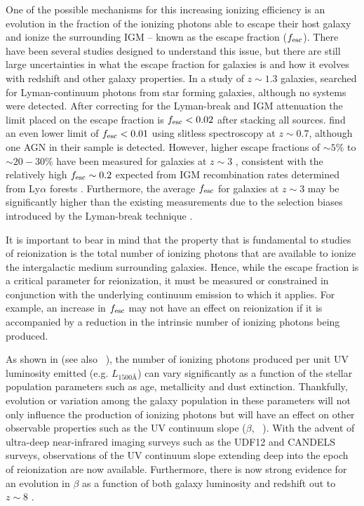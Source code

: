 One of the possible mechanisms for this increasing ionizing efficiency is an evolution in the fraction of the ionizing photons able to escape their host galaxy and ionize the surrounding IGM -- known as the escape fraction ($f_{\rm{esc}}$). There have been several studies designed to understand this issue, but there are still large uncertainties in what the escape fraction for galaxies is and how it evolves with redshift and other galaxy properties. In a study of $z \sim 1.3$ galaxies, \citet{Siana:2010bo} searched for Lyman-continuum photons from star forming galaxies, although no systems were detected.  After correcting for the Lyman-break and IGM attenuation the limit placed on the escape fraction is $f_{\rm esc} < 0.02$ after stacking all sources. \citet{Bridge:2010ie} find an even lower limit of $f_{\rm esc} < 0.01$ using slitless spectroscopy at $z \sim 0.7$, although one AGN in their sample is detected. However, higher escape fractions of $\sim5\%$ to $\sim20-30\%$ have been measured for galaxies at $z \sim 3$  \citep{Shapley:2006cq,Iwata:2009dy,Vanzella:2010jk,Nestor:2013kw}, consistent with the relatively high $f_{\rm esc} \sim 0.2$ expected from IGM recombination rates determined from Ly$\alpha$ forests \citep{Bolton:2007gc}. Furthermore, the average $f_{\rm{esc}}$ for galaxies at $z\sim3$ may be significantly higher than the existing measurements due to the selection biases introduced by the Lyman-break technique \citep{Cooke:2014dd}. 

It is important to bear in mind that the property that is fundamental to studies of reionization is the total number of ionizing photons that are available to ionize the intergalactic medium surrounding galaxies. Hence, while the escape fraction is a critical parameter for reionization, it must be measured or constrained in conjunction with the underlying continuum emission to which it applies. For example, an increase in $f_{\rm{esc}}$ may not have an effect on reionization if it is accompanied by a reduction in the intrinsic number of ionizing photons being produced.

As shown in \citet{Robertson:2013ji} (see also \citeauthor{Leitherer:1999jt}~\citeyear{Leitherer:1999jt}), the number of ionizing photons produced per unit UV luminosity emitted (e.g. $L_{1500\text{\AA}}$) can vary significantly as a function of the stellar population parameters such as age, metallicity and dust extinction. Thankfully, evolution or variation among the galaxy population in these parameters will not only influence the production of ionizing photons but will have an effect on other observable properties such as the UV continuum slope ($\beta$, \citeauthor{1994ApJ...429..582C}~\citeyear{1994ApJ...429..582C}).
With the advent of ultra-deep near-infrared imaging surveys such as the UDF12 \citep{Koekemoer:2013db} and CANDELS \citep{2011ApJS..197...35G,Koekemoer:2011br} surveys, observations of the UV continuum slope extending deep into the epoch of reionization are now available. Furthermore, there is now strong evidence for an evolution in $\beta$ as a function of both galaxy luminosity and redshift out to $z\sim 8$ \citep{Bouwens:2013vf,Rogers:2014bn}.

